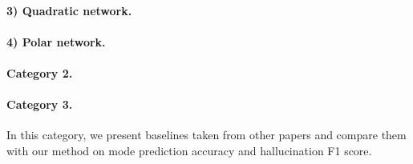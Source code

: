 \paragraph{3) Quadratic network.}

\paragraph{4) Polar network.}

\paragraph{Category 2.}

\paragraph{Category 3.}
In this category, we present baselines taken from other papers and compare them with our method
on mode prediction accuracy and hallucination F1 score.

\clearpage
